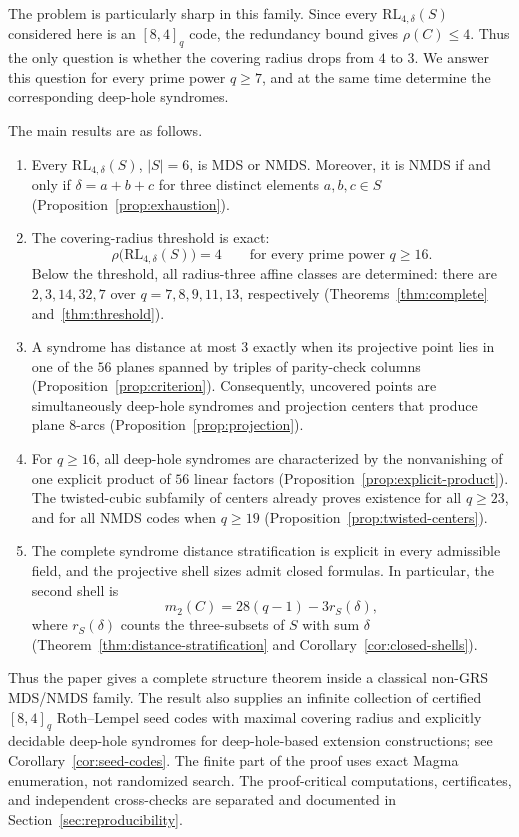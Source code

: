 \documentclass[11pt]{article}
\newcommand{\RL}{\mathrm{RL}}
\theoremstyle{plain}
\theoremstyle{definition}
\begin{document}
The problem is particularly sharp in this family.  Since every
\(\RL_{4,\delta}(S)\) considered here is an \([8,4]_q\) code, the redundancy
bound gives \(\rho(C)\le4\).  Thus the only question is whether the covering
radius drops from \(4\) to \(3\).  We answer this question for every prime
power \(q\ge7\), and at the same time determine the corresponding deep-hole
syndromes.

The main results are as follows.
\begin{enumerate}
\item Every \(\RL_{4,\delta}(S)\), \(|S|=6\), is MDS or NMDS.  Moreover,
it is NMDS if and only if
\(\delta=a+b+c\) for three distinct elements \(a,b,c\in S\)
(Proposition~\ref{prop:exhaustion}).
\item The covering-radius threshold is exact:
\[
 \rho\bigl(\RL_{4,\delta}(S)\bigr)=4
 \qquad\text{for every prime power }q\ge16.
\]
Below the threshold, all radius-three affine classes are determined:
there are \(2,3,14,32,7\) over \(q=7,8,9,11,13\), respectively
(Theorems~\ref{thm:complete} and~\ref{thm:threshold}).
\item A syndrome has distance at most \(3\) exactly when its projective point
lies in one of the \(56\) planes spanned by triples of parity-check columns
(Proposition~\ref{prop:criterion}).  Consequently, uncovered points are
simultaneously deep-hole syndromes and projection centers that produce plane
\(8\)-arcs (Proposition~\ref{prop:projection}).
\item For \(q\ge16\), all deep-hole syndromes are characterized by the
nonvanishing of one explicit product of \(56\) linear factors
(Proposition~\ref{prop:explicit-product}).  The twisted-cubic subfamily of
centers already proves existence for all \(q\ge23\), and for all NMDS codes
when \(q\ge19\) (Proposition~\ref{prop:twisted-centers}).
\item The complete syndrome distance stratification is explicit in every
admissible field, and the projective shell sizes admit closed formulas.  In
particular, the second shell is
\[
 m_2(C)=28(q-1)-3r_S(\delta),
\]
where \(r_S(\delta)\) counts the three-subsets of \(S\) with sum \(\delta\)
(Theorem~\ref{thm:distance-stratification} and
Corollary~\ref{cor:closed-shells}).
\end{enumerate}

Thus the paper gives a complete structure theorem inside a classical
non-GRS MDS/NMDS family.  The result also supplies an infinite collection of
certified
\([8,4]_q\) Roth--Lempel seed codes with maximal covering radius and
explicitly decidable deep-hole syndromes for deep-hole-based extension
constructions; see Corollary~\ref{cor:seed-codes}.  The finite part of the
proof uses exact Magma enumeration, not randomized search.  The
proof-critical computations, certificates, and independent cross-checks are
separated and documented in Section~\ref{sec:reproducibility}.
\end{document}
